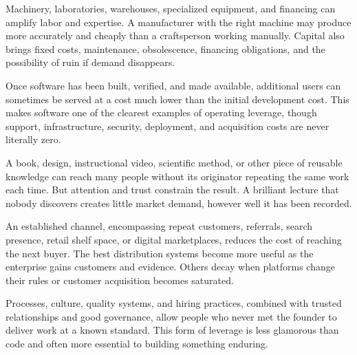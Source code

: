 \par\vspace{1pt}
Machinery, laboratories, warehouses, specialized equipment, and financing can amplify labor and expertise. A manufacturer with the right machine may produce more accurately and cheaply than a craftsperson working manually. Capital also brings fixed costs, maintenance, obsolescence, financing obligations, and the possibility of ruin if demand disappears.
\vspace{3.5pt}

\par\vspace{1pt}
Once software has been built, verified, and made available, additional users can sometimes be served at a cost much lower than the initial development cost. This makes software one of the clearest examples of operating leverage, though support, infrastructure, security, deployment, and acquisition costs are never literally zero.
\vspace{3.5pt}

\par\vspace{1pt}
A book, design, instructional video, scientific method, or other piece of reusable knowledge can reach many people without its originator repeating the same work each time. But attention and trust constrain the result. A brilliant lecture that nobody discovers creates little market demand, however well it has been recorded.
\vspace{3.5pt}

\par\vspace{1pt}
An established channel, encompassing repeat customers, referrals, search presence, retail shelf space, or digital marketplaces, reduces the cost of reaching the next buyer. The best distribution systems become more useful as the enterprise gains customers and evidence. Others decay when platforms change their rules or customer acquisition becomes saturated.
\vspace{3.5pt}

\par\vspace{1pt}
Processes, culture, quality systems, and hiring practices, combined with trusted relationships and good governance, allow people who never met the founder to deliver work at a known standard. This form of leverage is less glamorous than code and often more essential to building something enduring.
\vspace{3.5pt}

